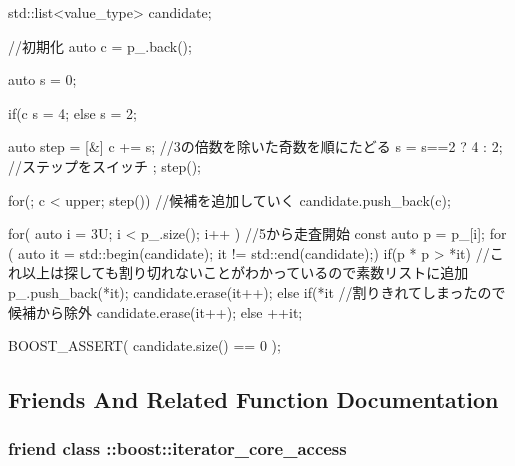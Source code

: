 \begin{DoxyCode}
        {
            std::list<value_type> candidate{};

            {   //初期化
                auto c = p_.back();

                auto s = 0;
            
                if(c %
                    s = 4;
                else
                    s = 2;
            
                auto step = [&]{
                    c += s;           //3の倍数を除いた奇数を順にたどる
                    s = s==2 ? 4 : 2; //ステップをスイッチ
                };
                step();
            
                for(; c < upper; step())
                { //候補を追加していく
                    candidate.push_back(c);
                }
            }

            for( auto i = 3U; i < p_.size(); i++ )
            {   //5から走査開始
                const auto p = p_[i];
                for ( auto it = std::begin(candidate);
                      it != std::end(candidate);)
                {
                    if(p * p > *it)
                    {   //これ以上は探しても割り切れないことがわかっているので素数リストに追加
                        p_.push_back(*it);
                        candidate.erase(it++);
                    }
                    else if(*it %
                    {   //割りきれてしまったので候補から除外
                        candidate.erase(it++);
                    }
                    else
                    {
                        ++it;
                    }
                }
            }

            BOOST_ASSERT( candidate.size() == 0 );
        }
\end{DoxyCode}


\subsection{\-Friends \-And \-Related \-Function \-Documentation}
\hypertarget{classyuh_1_1range__detail_1_1prime__iterator_a986bf0deaa7559f361d03122eeea4c86}{
\subsubsection[{\-::boost\-::iterator\-\_\-core\-\_\-access}]{\setlength{\rightskip}{0pt plus 5cm}friend class \-::boost\-::iterator\-\_\-core\-\_\-access}}\label{d9/dc8/classyuh_1_1range__detail_1_1prime__iterator_a986bf0deaa7559f361d03122eeea4c86}


